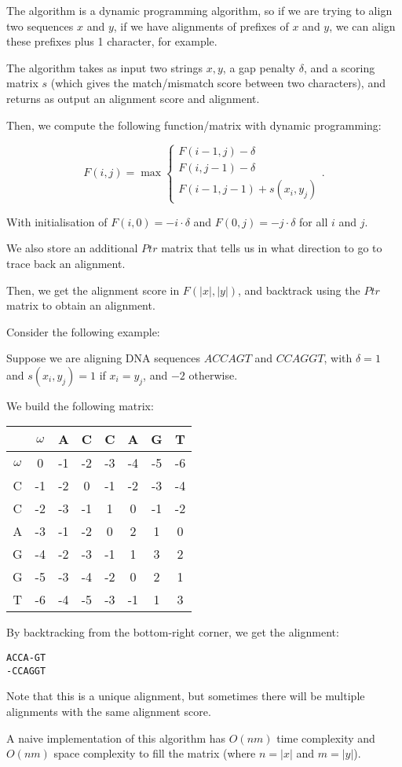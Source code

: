 \begin{enumerate}[label=(\alph*)]
The algorithm is a dynamic programming algorithm, so if we are trying to align two sequences $x$ and $y$, if we have alignments of prefixes of $x$ and $y$, we can align these prefixes plus 1 character, for example.

The algorithm takes as input two strings $x, y$, a gap penalty $\delta$, and a scoring matrix $s$ (which gives the match/mismatch score between two characters), and returns as output an alignment score and alignment.

Then, we compute the following function/matrix with dynamic programming:

\[
  F(i,j) = \max\begin{cases}F(i-1, j) - \delta\\F(i, j-1) - \delta\\F(i-1, j-1)+ s(x_i, y_j)\end{cases}
.\] 

With initialisation of $F(i,0) = -i \cdot \delta$ and $F(0, j) = -j \cdot \delta$ for all $i$ and $j$.

We also store an additional $Ptr$ matrix that tells us in what direction to go to trace back an alignment.

Then, we get the alignment score in $F(|x|, |y|)$, and backtrack using the $Ptr$ matrix to obtain an alignment.

Consider the following example:

Suppose we are aligning DNA sequences $ACCAGT$ and $CCAGGT$, with $\delta = 1$ and $s(x_i, y_j) = 1$ if $x_i = y_j$, and $-2$ otherwise.

We build the following matrix:

\begin{tabular}{c|c|c|c|c|c|c|c}
  &$\omega$&A&C&C&A&G&T\\
  \hline
  $\omega$&0&-1&-2&-3&-4&-5&-6\\
  \hline
  C&-1&-2&0&-1&-2&-3&-4\\
  \hline
  C&-2&-3&-1&1&0&-1&-2\\
  \hline
  A&-3&-1&-2&0&2&1&0\\
  \hline
  G&-4&-2&-3&-1&1&3&2\\
  \hline
  G&-5&-3&-4&-2&0&2&1\\
  \hline
  T&-6&-4&-5&-3&-1&1&3
\end{tabular}

By backtracking from the bottom-right corner, we get the alignment:

\begin{verbatim}
ACCA-GT
-CCAGGT
\end{verbatim}

Note that this is a unique alignment, but sometimes there will be multiple alignments with the same alignment score.

A naive implementation of this algorithm has $O(nm)$ time complexity and $O(nm)$ space complexity to fill the matrix (where $n = |x|$ and $m = |y|$).
        
    \end{enumerate}


